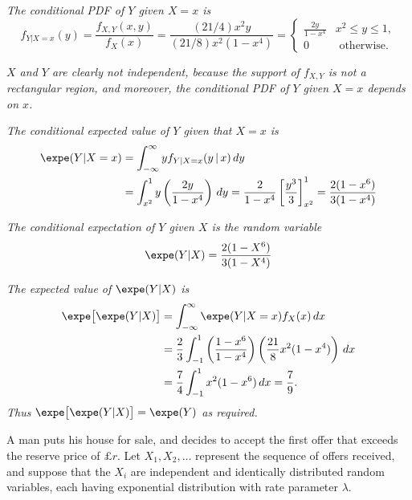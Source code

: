 \begin{exercise}
\begin{questions}
\begin{answer}
\it %
The conditional PDF of $Y$ given $X=x$ is
\[
f_{Y|X=x}(y) 	
	= \frac{f_{X,Y}(x,y)}{f_X(x)} 
	= \frac{(21/4)x^2y}{(21/8)x^2(1-x^4)} 	
	= \begin{cases} 
		\displaystyle\frac{2y}{1-x^4} 	& x^2\leq y\leq 1, \\
	 	0 								& \text{ otherwise}.
	 \end{cases}
\]	 

\it %
$X$ and $Y$ are clearly not independent, because the support of $f_{X,Y}$ is not a rectangular region, and moreover, the conditional PDF of $Y$ given $X=x$ depends on $x$.

\it %
The conditional expected value of $Y$ given that $X=x$ is
\begin{align*}
\expe(Y|X=x) 
	& = \int_{-\infty}^{\infty} y f_{Y|X=x}(y\,|\,x)\,dy \\
	& = \int_{x^2}^1 y \left(\frac{2y}{1-x^4}\right)\,dy 
	= \frac{2}{1-x^4}\left[\frac{y^3}{3}\right]_{x^2}^1
	= \frac{2(1-x^6)}{3(1-x^4)} 
\end{align*}	

\it %
The conditional expectation of $Y$ given $X$ is the random variable 
\[
\expe(Y|X)=\displaystyle\frac{2(1-X^6)}{3(1-X^4)}
\]

\it %
The expected value of $\expe(Y|X)$ is
\begin{align*}
\expe\big[\expe(Y|X)\big] 
	& = \int_{-\infty}^{\infty} \expe(Y|X=x)f_X(x)\,dx \\
	& = \frac{2}{3}\int_{-1}^{1} \left(\frac{1-x^6}{1-x^4}\right)\left(\frac{21}{8}x^2(1-x^4)\right)\,dx \\
	& = \frac{7}{4}\int_{-1}^{1} x^2(1-x^6)\,dx 
	= \frac{7}{9}.
\end{align*}	
Thus $\expe\big[\expe(Y|X)\big]=\expe(Y)$ as required.
\een
\end{answer}

\question
A man puts his house for sale, and decides to accept the first offer that exceeds the reserve price of $\pounds r$. Let $X_1,X_2,\ldots$ represent the sequence of offers received, and suppose that the $X_i$ are independent and identically distributed random variables, each having exponential distribution with rate parameter $\lambda$. 
\end{questions}
\end{exercise}
